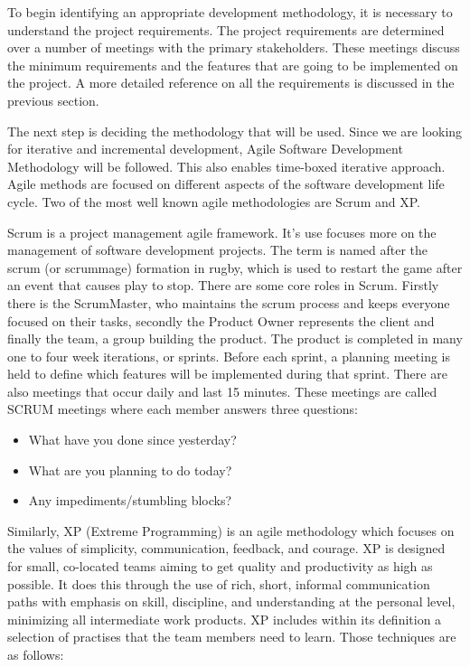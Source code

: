 To begin identifying an appropriate development methodology, it is necessary to understand the project requirements. The project requirements are determined over a number of meetings with the primary stakeholders. These meetings discuss the minimum requirements and the features that are going to be implemented on the project. A more detailed reference on all the requirements is discussed in the previous section.

The next step is deciding the methodology that will be used. Since we are looking for iterative and incremental development, Agile Software Development Methodology will be followed. This also enables time-boxed iterative approach. Agile methods are focused on different aspects of the software development life cycle. Two of the most well known agile methodologies are Scrum and XP.

Scrum is a project management agile framework. It's use focuses more on the management of software development projects. The term is named after the scrum (or scrummage) formation in rugby, which is used to restart the game after an event that causes play to stop. There are some core roles in Scrum. Firstly there is the ScrumMaster, who maintains the scrum process and keeps everyone focused on their tasks, secondly the Product Owner represents the client and finally the team, a group building the product. The product is completed in many one to four week iterations, or sprints. Before each sprint, a planning meeting is held to define which features will be implemented during that sprint. There are also meetings that occur daily and last 15 minutes. These meetings are called SCRUM meetings where each member answers three questions: 

\begin{itemize}
\item What have you done since yesterday?
\item What are you planning to do today?
\item Any impediments/stumbling blocks?
\end{itemize}

Similarly, XP (Extreme Programming) is an agile methodology which focuses on the values of simplicity, communication, feedback, and courage. XP is designed for small, co-located teams aiming to get quality and productivity as high as possible. It does this through the use of rich, short, informal communication paths with emphasis on skill, discipline, and understanding at the personal level, minimizing all intermediate work products. XP includes within its definition a selection of practises that the team members need to learn. Those techniques are as follows:

